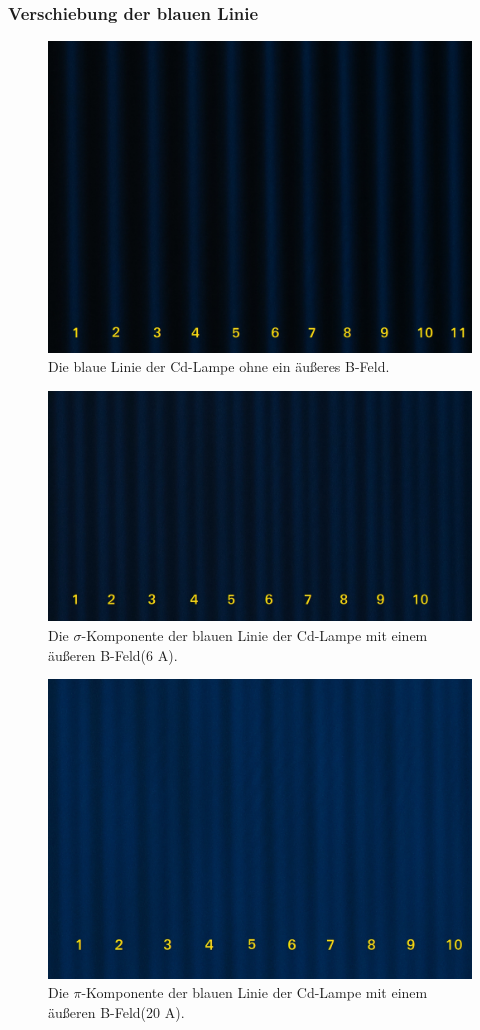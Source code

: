 \subsubsection{Verschiebung der blauen Linie}

\begin{figure}
  \centering
  \includegraphics[width=0.8\linewidth]{Bilder/BoB.JPG}
  \caption{Die blaue Linie der Cd-Lampe ohne ein äußeres B-Feld.}
  \label{fig:BoB}
\end{figure}

\begin{figure}
  \centering
  \includegraphics[width=0.8\linewidth]{Bilder/B6ASig.JPG}
  \caption{Die $\sigma$-Komponente der blauen Linie der Cd-Lampe mit einem äußeren B-Feld(6 A).}
  \label{fig:B6ASig}
\end{figure}

\begin{figure}
  \centering
  \includegraphics[width=0.8\linewidth]{Bilder/B20APi.JPG}
  \caption{Die $\pi$-Komponente der blauen Linie der Cd-Lampe mit einem äußeren B-Feld(20 A).}
  \label{fig:B20APi}
\end{figure}

